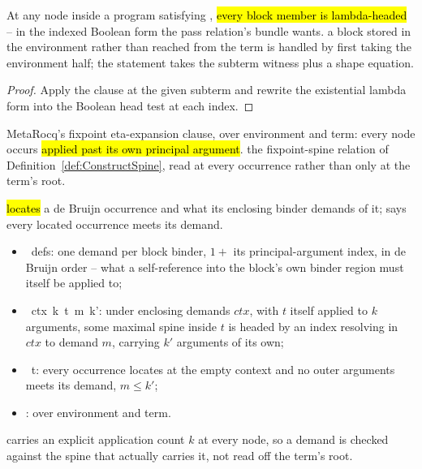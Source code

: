 \begin{lemma}
\label{lem:FixLambda-of_onProgram}
\leanok
{}
 At any  node inside a program satisfying , \hl{every block
member is lambda-headed} -- in the indexed Boolean form the pass relation's bundle wants.
 a block stored in the environment rather than reached from the term is handled by first
taking the environment half; the statement takes the subterm witness plus a shape equation.
\end{lemma}
\begin{proof}
\leanok
{}
 Apply the clause at the given subterm and rewrite the existential lambda form into the
Boolean head test at each index.
\end{proof}

\begin{definition}
\label{def:LBExpandedFix}
\leanok
{}
 MetaRocq's fixpoint eta-expansion clause, over environment and term: every
 node occurs \hl{applied past its own principal argument}.
 the fixpoint-spine relation of Definition~\ref{def:ConstructSpine}, read at every
occurrence rather than only at the term's root.
\end{definition}

\begin{definition}
\label{def:BVarDemand}
\leanok
{}
  \hl{locates} a de Bruijn occurrence and what its enclosing binder
demands of it;  says every located occurrence meets its demand.
\begin{itemize}
\item {}\ defs: one demand per block binder, $1 + $ its principal-argument index, in de
Bruijn order -- what a self-reference into the block's own binder region must itself be applied to;
\item {}\ ctx\ k\ t\ m\ k': under enclosing demands $ctx$, with $t$ itself applied to
$k$ arguments, some maximal spine inside $t$ is headed by an index resolving in $ctx$ to demand $m$,
carrying $k'$ arguments of its own;
\item {}\ t: every occurrence  locates at the empty context and no
outer arguments meets its demand, $m \leq k'$;
\item {}:  over environment and term.
\end{itemize}
  carries an explicit application count $k$ at every node, so a demand is
checked against the spine that actually carries it, not read off the term's root.
\end{definition}

